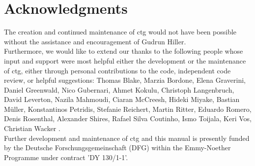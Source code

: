 \chapter{Acknowledgments}

The creation and continued maintenance of ctg would not have been possible without
the assistance and encouragement of Gudrun Hiller.\\

Furthermore, we would like to extend our thanks to the following people
whose input and support were most helpful either the development or the
maintenance of ctg, either through personal contributions to the code,
independent code review, or helpful suggestions:
Thomas Blake,
Marzia Bordone,
Elena Graverini,
Daniel Greenwald,
Nico Gubernari,
Ahmet Kokulu,
Christoph Langenbruch,
David Leverton,
Nazila Mahmoudi,
Ciaran McCreesh,
Hideki Miyake,
Bastian Müller,
Konstantinos Petridis,
Stefanie Reichert,
Martin Ritter,
Eduardo Romero,
Denis Rosenthal,
Alexander Shires,
Rafael Silva Coutinho,
Ismo Toijala,
Keri Vos,
Christian Wacker
.\\

Further development and maintenance of ctg and this manual is presently funded by the
Deutsche Forschungsgemeinschaft (DFG) within the Emmy-Noether Programme under contract
'DY 130/1-1'.
